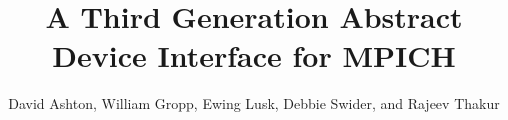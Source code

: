 \documentclass{article}
\begin{document}
\title{A Third Generation Abstract Device Interface for MPICH}
\author{David Ashton, William Gropp, Ewing Lusk, Debbie Swider, and Rajeev
  Thakur}
\maketitle

\pagestyle{plain}
{\parskip=0pt
\tableofcontents

\bigskip
}
\bigskip

\pagestyle{plain}
\clearpage

\setcounter{page}{1}



\end{document}
